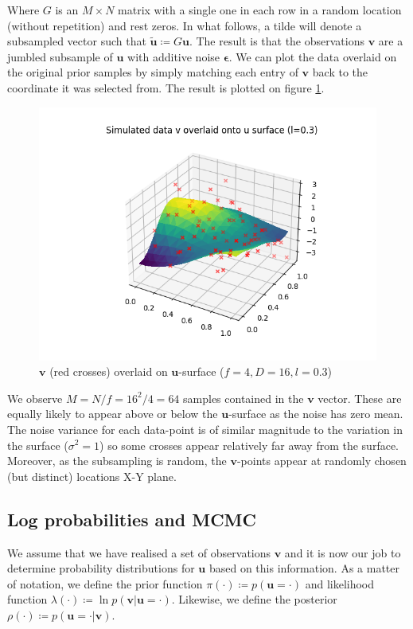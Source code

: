\documentclass[]{article}
\newcommand{\figwidth}{0.4\linewidth}
\newcommand{\lik}{\lambda}
\newcommand{\ubold}{\boldsymbol{u}}
\newcommand{\vbold}{\boldsymbol{v}}
\newcommand{\epsbold}{\boldsymbol{\epsilon}}
\begin{document}
Where $G$ is an $M \times N$ matrix with a single one in each row in a random location (without repetition) and rest zeros. In what follows, a tilde will denote a subsampled vector such that $\tilde{\ubold} \coloneqq G\ubold$. The result is that the observations $\vbold$ are a jumbled subsample of $\ubold$ with additive noise $\epsbold$. We can plot the data overlaid on the original prior samples by simply matching each entry of $\vbold$ back to the coordinate it was selected from. The result is plotted on figure \ref{fig:v-on-u}.
%
\begin{figure}[!h]
	\centering
	\includegraphics[width=\figwidth]{v-overlay.png}
	\caption{$\vbold$ (red crosses) overlaid on $\ubold$-surface ($f=4, D=16, l=0.3$)}
	\label{fig:v-on-u}
\end{figure}

We observe $M=N/f=16^2/4=64$ samples contained in the $\vbold$ vector. These are equally likely to appear above or below the $\ubold$-surface as the noise has zero mean. The noise variance for each data-point is of similar magnitude to the variation in the surface ($\sigma^2 = 1$) so some crosses appear relatively far away from the surface. Moreover, as the subsampling is random, the $\vbold$-points appear at randomly chosen (but distinct) locations X-Y plane.

\subsection{Log probabilities and MCMC}

We assume that we have realised a set of observations $\vbold$ and it is now our job to determine probability distributions for $\ubold$ based on this information. As a matter of notation, we define the prior function $\pi(\cdot) \coloneqq p(\ubold=\cdot)$ and likelihood function $\lik(\cdot) \coloneqq \ln p (\vbold | \ubold = \cdot)$. Likewise, we define the posterior $\rho(\cdot) \coloneqq p(\ubold=\cdot | \vbold)$.
\end{document}
